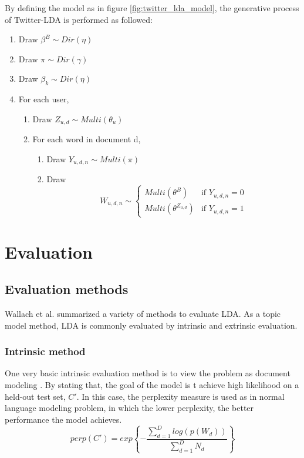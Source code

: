 \documentclass[conference,compsoc]{IEEEtran}
\begin{document}
By defining the model as in figure \ref{fig:twitter_lda_model}, the generative process of Twitter-LDA is performed as followed:
\begin{enumerate}
	\item Draw $\beta^B \sim Dir(\eta)$
	\item Draw $\pi \sim Dir(\gamma)$
	\item Draw $\beta_k \sim Dir(\eta)$
	\item For each user,
		\begin{enumerate}
			\item Draw $Z_{u,d} \sim Multi(\theta_u)$
			\item For each word in document d,
				\begin{enumerate}
					\item Draw $Y_{u,d,n} \sim Multi(\pi)$
					\item Draw \[W_{u,d,n} \sim 
					\begin{cases}
						Multi(\theta^B) & \text{if $Y_{u,d,n} = 0$}\\
						Multi(\theta^{Z_{u,d}}) & \text{if $Y_{u,d,n} = 1$}
					\end{cases}\]
				\end{enumerate}
		\end{enumerate}
\end{enumerate}


\section{Evaluation}

\subsection{Evaluation methods}
Wallach et al. \cite{Wallach2009a} summarized a variety of methods to evaluate LDA. As a topic model method, LDA is commonly evaluated by intrinsic and extrinsic evaluation. 

\subsubsection{Intrinsic method}

One very basic intrinsic evaluation method is to view the problem as document modeling \cite{Blei2003}. By stating that, the goal of the model is t achieve high likelihood on a held-out test set, $C'$. In this case, the perplexity measure is used as in normal language modeling problem, in which the lower perplexity, the better performance the model achieves.
\[perp(C')=exp\left\{-\frac{\sum_{d=1}^{D}{log(p(W_d))}}{\sum_{d=1}^{D}N_d}\right\}\]
\end{document}
